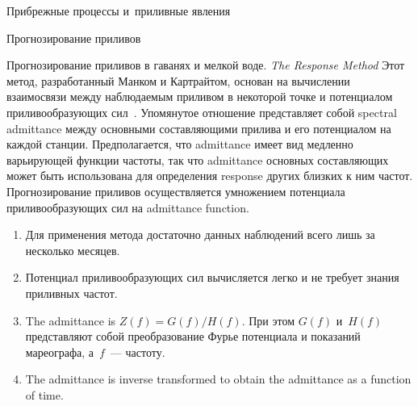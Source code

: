 \begin{chapter}{Прибрежные процессы и~приливные явления}
\begin{section}{Прогнозирование приливов}
\begin{paragraph}{Прогнозирование приливов в гаванях и мелкой воде.}
\textit{The Response Method} Этот метод, разработанный Манком и Картрайтом, основан на
вычислении взаимосвязи между наблюдаемым приливом в некоторой точке и
потенциалом приливообразующих сил~\cite{Munk:1966b}.
Упомянутое отношение представляет собой spectral admittance
между основными составляющими прилива и его потенциалом на каждой станции.
Предполагается, что admittance имеет вид медленно варьирующей функции частоты,
так что admittance основных составляющих может быть использована для 
определения response других близких к ним частот. Прогнозирование приливов
осуществляется умножением потенциала приливообразующих сил на admittance
function.
%
%
\begin{enumerate}
\item 
Для применения метода достаточно данных наблюдений всего лишь 
за несколько месяцев.
%

\item 
Потенциал приливообразующих сил вычисляется легко и не требует знания 
приливных частот.
%

\item 
The admittance is $Z(f) = G(f)/H(f)$. При этом $G(f)$ и~$H(f)$ представляют
собой преобразование Фурье потенциала и показаний мареографа, 
а~$f$~--- частоту.
%

\item 
The admittance is inverse transformed to obtain the admittance as a
function of time.
%


\end{enumerate}
\end{paragraph}
\end{section}
\end{chapter}
